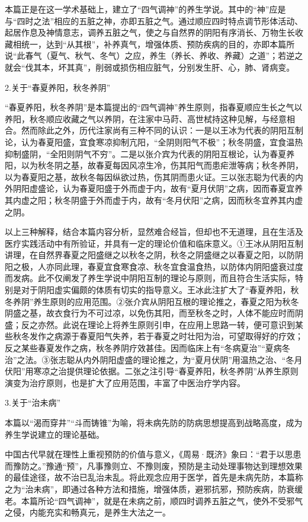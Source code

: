 \documentclass[draft,12pt]{ctexbook}
\begin{document}
本篇正是在这一学术基础上，建立了“四气调神”的养生学说。其中的“神”应是与“四时之法”相应的五脏之神，亦即五脏之气。通过顺应四时特点调节形体活动、起居作息及神情意志，调养五脏之气，使之与自然界的阴阳有序消长、万物生长收藏相统一，达到“从其根”，补养真气，增强体质、预防疾病的目的，亦即本篇所说“此春气（夏气、秋气、冬气）之应，养生（养长、养收、养藏）之道”；若逆之就会“伐其本，坏其真”，削弱或损伤相应脏气，分别发生肝、心，肺、肾病变。

2.关于“春夏养阳，秋冬养阴”

“春夏养阳，秋冬养阴”是本篇提出的“四气调神”养生原则，指春夏顺应生长之气以养阳，秋冬顺应收藏之气以养阴，在注家中马莳、高世栻持这种见解，与经意相合。然而除此之外，历代注家尚有三种不同的认识：一是以王冰为代表的阴阳互制论，认为春夏阳盛，宜食寒凉抑制亢阳，“全阴则阳气不极”；秋冬阴盛，宜食温热抑制盛阴，“全阳则阴气不穷”。二是以张介宾为代表的阴阳互根论，认为春夏养阳，以为秋冬阴之基，故春夏每因风凉生冷，伤其阳气而患疟泄等病；秋冬养阴，以为春夏阳之基，故秋冬每因纵欲过热，伤其阴而患火证。三以张志聪为代表的内外阴阳虚盛论，认为春夏阳盛于外而虚于内，故有“夏月伏阴”之病，因而春夏宜养其内虚之阳；秋冬阴盛于外而虚于内，故有“冬月伏阳”之病，因而秋冬宜养其内虚之阴。

以上三种解释，结合本篇内容分析，显然难合经旨，但却也不无道理，且在生活及医疗实践活动中有所验证，并具有一定的理论价值和临床意义。①王冰从阴阳互制讲理，在自然界春夏之阳盛继之以秋冬之阴，秋冬之阴盛继之以春夏之阳，以防阴阳之极，人亦同此理，春夏宜食寒食凉、秋冬宜食温食热，以防体内阴阳盛衰过度而发病。此不仅阐发了养生学说中阴阳互制的理论与原则，而且符合生活实际，特别是对于阴阳虚实偏颇的体质有切实的指导意义。王冰此注扩大了“春夏养阳，秋冬养阴”养生原则的应用范围。②张介宾从阴阳互根的理论推之，春夏之阳为秋冬阴盛之基，故衣食行为不可过凉，以免伤其阳，而至秋冬之时，人体不能应时而阴盛；反之亦然。此说在理论上将养生原则引申，在应用上思路一转，便可意识到某些秋冬发作之病源于春夏阳气失养，若于春夏之时壮阳为治，可望取得好的疗效；反之某些春夏发作之病，秋冬养阴疗效甚佳。因而临床上有“冬病夏治”“夏病冬治”之法。③张志聪从内外阴阳虚盛的理论推之，为“夏月伏阴”用温热之治、“冬月伏阳”用寒凉之治提供理论依据。二张之注引导“春夏养阳，秋冬养阴”从养生原则演变为治疗原则，也是扩大了应用范围，丰富了中医治疗学内容。

3.关于“治未病”

本篇以“渴而穿井”“斗而铸锥”为喻，将未病先防的防病思想提高到战略高度，成为养生学说建立的理论基础。

中国古代早就在理性上重视预防的价值与意义，《周易·既济》象曰：“君于以思患而豫防之。”豫通“预”，凡事豫则立、不豫则废，预防是主动处理事物达到理想效果的最佳途径，故不治已乱治未乱。将此观念应用于医学，首先是未病先防，本篇称之为“治未病”，即通过各种方法和措施，增强体质，避邪抗邪，预防疾病，防衰缓老。本篇所论“四气调神”，就是在未病之前，顺四时调养五脏之气，使外不受邪气之侵，内能充实和畅真元，是养生大法之一。
\end{document}
